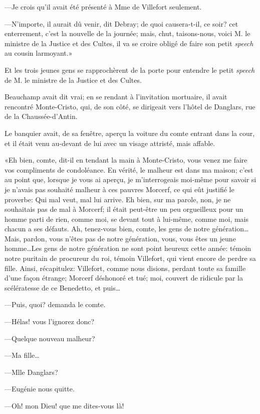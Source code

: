 —Je crois qu'il avait été présenté à Mme de Villefort seulement. 

—N'importe, il aurait dû venir, dit Debray; de quoi causera-t-il, ce soir? cet enterrement, c'est la nouvelle de la journée; mais, chut, taisons-nous, voici M. le ministre de la Justice et des Cultes, il va se croire obligé de faire son petit \textit{speech} au cousin larmoyant.» 

Et les trois jeunes gens se rapprochèrent de la porte pour entendre le petit \textit{speech} de M. le ministre de la Justice et des Cultes. 

Beauchamp avait dit vrai; en se rendant à l'invitation mortuaire, il avait rencontré Monte-Cristo, qui, de son côté, se dirigeait vers l'hôtel de Danglars, rue de la Chaussée-d'Antin. 

Le banquier avait, de sa fenêtre, aperçu la voiture du comte entrant dans la cour, et il était venu au-devant de lui avec un visage attristé, mais affable. 

«Eh bien, comte, dit-il en tendant la main à Monte-Cristo, vous venez me faire vos compliments de condoléance. En vérité, le malheur est dans ma maison; c'est au point que, lorsque je vous ai aperçu, je m'interrogeais moi-même pour savoir si je n'avais pas souhaité malheur à ces pauvres Morcerf, ce qui eût justifié le proverbe: Qui mal veut, mal lui arrive. Eh bien, sur ma parole, non, je ne souhaitais pas de mal à Morcerf; il était peut-être un peu orgueilleux pour un homme parti de rien, comme moi, se devant tout à lui-même, comme moi, mais chacun a ses défauts. Ah, tenez-vous bien, comte, les gens de notre génération\dots Mais, pardon, vous n'êtes pas de notre génération, vous, vous êtes un jeune homme\dots Les gens de notre génération ne sont point heureux cette année: témoin notre puritain de procureur du roi, témoin Villefort, qui vient encore de perdre sa fille. Ainsi, récapitulez: Villefort, comme nous disions, perdant toute sa famille d'une façon étrange; Morcerf déshonoré et tué; moi, couvert de ridicule par la scélératesse de ce Benedetto, et puis\dots 

—Puis, quoi? demanda le comte. 

—Hélas! vous l'ignorez donc? 

—Quelque nouveau malheur? 

—Ma fille\dots 

—Mlle Danglars? 

—Eugénie nous quitte. 

—Oh! mon Dieu! que me dites-vous là! 

